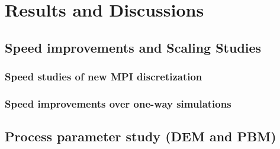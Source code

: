 \documentclass[preprint,11pt,authoryear]{elsarticle}
\begin{document}
\section{Results and Discussions}

\subsection{Speed improvements and Scaling Studies}

\subsubsection{Speed studies of new MPI discretization}

\subsubsection{Speed improvements over one-way simulations}

\subsection{Process parameter study (DEM and PBM)}
 



%

\end{document}
